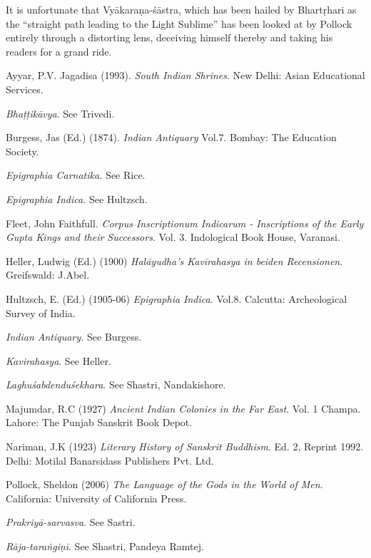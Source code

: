 It is unfortunate that Vyākaraṇa-śāstra, which has been hailed by Bhartṛhari as the ``straight path leading to the Light Sublime'' has been looked at by Pollock entirely through a distorting lens, deceiving himself thereby and taking his readers for a grand ride. 

\begin{thebibliography}{99}
\itemsep=2pt
Ayyar, P.V. Jagadisa (1993). {\sl South Indian Shrines}. New Delhi: Asian Educational Services. 

{\sl Bhaṭṭikāvya}. See Trivedi.

Burgess, Jas (Ed.) (1874). {\sl Indian Antiquary} Vol.7. Bombay: The Education Society.

{\sl Epigraphia Carnatika.} See Rice. 

{\sl Epigraphia Indica.} See Hultzsch. 

Fleet, John Faithfull. {\sl Corpus Inscriptionum Indicarum - Inscriptions of the Early Gupta Kings and their Successors}. Vol. 3. Indological Book House, Varanasi.

Heller, Ludwig (Ed.) (1900) {\sl Halāyudha's Kavīrahasya in beiden Recensionen}. Greifswald: J.Abel.

Hultzsch, E. (Ed.) (1905-06) {\sl Epigraphia Indica}. Vol.8. Calcutta: Archeological Survey of India.

{\sl Indian Antiquary.} See Burgess.

{\sl Kavirahasya}. See Heller. 

{\sl Laghuśabdenduśekhara}. See Shastri, Nandakishore.

Majumdar, R.C (1927) {\sl Ancient Indian Colonies in the Far East}. Vol. 1 Champa. Lahore: The Punjab Sanskrit Book Depot. 

Nariman, J.K (1923) {\sl Literary History of Sanskrit Buddhism}. Ed. 2, Reprint 1992. Delhi: Motilal Banarsidass Publishers Pvt. Ltd. 

Pollock, Sheldon (2006) {\sl The Language of the Gods in the World of Men}. California: University of California Press. 

{\sl Prakriyā-sarvasva}. See Sastri.

{\sl Rāja-taraṅgiṇī}. See Shastri, Pandeya Ramtej.


\end{thebibliography}
